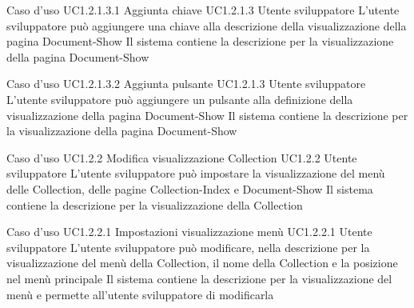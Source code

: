 \UCtitle
{Caso d'uso UC1.2.1.3.1}
{Aggiunta chiave}
\UC
{UC1.2.1.3}
{Utente sviluppatore}
{L'utente sviluppatore  può aggiungere una chiave alla descrizione della visualizzazione della pagina Document-Show}
{Il sistema contiene la descrizione per la visualizzazione della pagina Document-Show}

\UCtitle
{Caso d'uso UC1.2.1.3.2}
{Aggiunta pulsante}
\UC
{UC1.2.1.3}
{Utente sviluppatore}
{L'utente sviluppatore può aggiungere un pulsante alla definizione della visualizzazione della pagina Document-Show}
{Il sistema contiene la descrizione per la visualizzazione della pagina Document-Show}


\UCtitle
{Caso d'uso UC1.2.2}
{Modifica visualizzazione Collection}
\UC
{UC1.2.2}
{Utente sviluppatore}
{L'utente sviluppatore  può impostare la visualizzazione del menù delle Collection, delle pagine Collection-Index e Document-Show}
{Il sistema contiene la descrizione per la visualizzazione della Collection}

\UCtitle
{Caso d'uso UC1.2.2.1}
{Impostazioni visualizzazione menù}
\UC
{UC1.2.2.1}
{Utente sviluppatore}
{L'utente sviluppatore può modificare, nella descrizione per la visualizzazione del menù della Collection, il nome della Collection e la posizione nel menù principale}
{Il sistema contiene la descrizione per la visualizzazione del menù e permette all'utente sviluppatore di modificarla}


